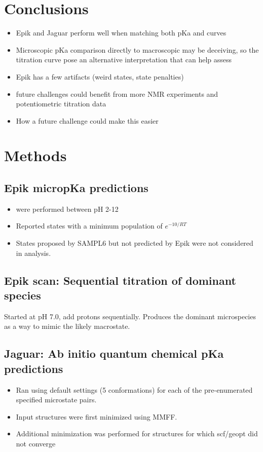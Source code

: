 \documentclass[9pt,lineno,final]{elife}
\begin{document}
\section{Conclusions}

\begin{itemize}
	\item Epik and Jaguar perform well when matching both pKa and curves
	\item Microscopic pKa comparison directly to macroscopic may be deceiving, so the titration curve pose an alternative interpretation that can help assess
	\item Epik has a few artifacts (weird states, state penalties)
	\item future challenges could benefit from more NMR experiments and potentiometric titration data
	\item How a future challenge could make this easier
\end{itemize}


\section{Methods}


\subsection{Epik micropKa predictions}
\begin{itemize}
	\item were performed between pH 2-12
	\item Reported states with a minimum population of $e^{-10/RT}$
	\item States proposed by SAMPL6 but not predicted by Epik were not considered in analysis.
	      
\end{itemize}

\subsection{Epik scan: Sequential titration of dominant species} 


Started at pH 7.0, add protons sequentially. 
%
Produces the dominant microspecies as a way to mimic the likely macrostate.
%


\subsection{Jaguar: Ab initio quantum chemical pKa predictions}
\begin{itemize}
	\item Ran using default settings (5 conformations) for each of the pre-enumerated specified microstate pairs.
	\item Input structures were first minimized using MMFF.
	\item Additional minimization was performed for structures for which scf/geopt did not converge
\end{itemize}
\end{document}
